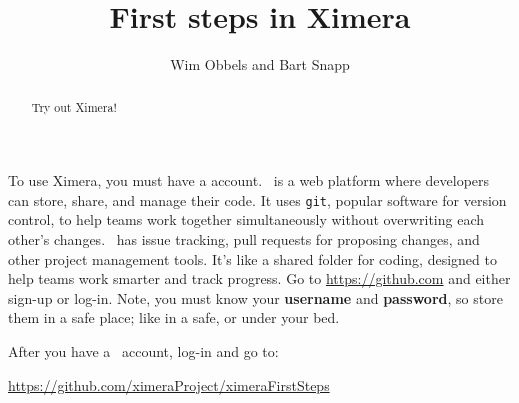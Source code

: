 \documentclass{ximera}
\author{Wim Obbels and Bart Snapp}
\title{First steps in Ximera}
\begin{document}
        \begin{abstract}
            Try out Ximera!
        \end{abstract}
        \maketitle

        To use Ximera, you must have a 
        account.
        \github\ is a web platform where developers can store, share, and
        manage
        their code. It uses \verb!git!, popular software for version control,
        to help
        teams work together simultaneously
        without overwriting each other's changes. \github\ has	issue tracking,
        pull requests for proposing changes, and other project management
        tools. It's
        like a shared folder
        for coding, designed to help teams work smarter and track progress.
        Go to \url{https://github.com} and either sign-up or log-in. Note, you
        must
        know
        your \textbf{username} and \textbf{password}, so store them in a safe
        place; like in a safe, or under your bed.

        After you have a \github\ account, log-in and go to:
        \begin{center}
            \url{https://github.com/ximeraProject/ximeraFirstSteps}
        \end{center}
\end{document}
